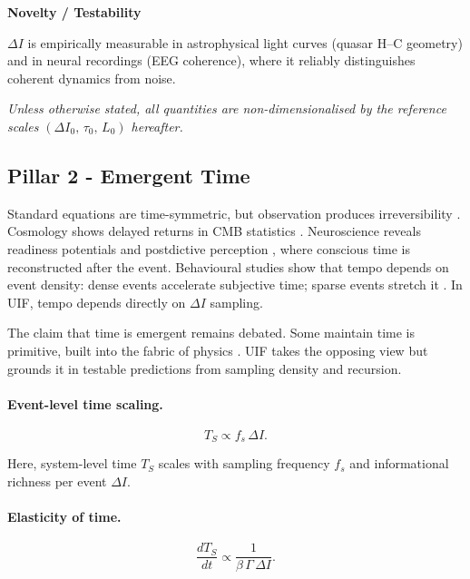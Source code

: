\noindent \textbf{Novelty / Testability}

\noindent $\Delta I$ is empirically measurable in astrophysical light curves (quasar H–C geometry) and in neural recordings (EEG coherence), where it reliably distinguishes coherent dynamics from noise.

\vspace{0.6em}
\noindent\textit{Unless otherwise stated, all quantities are non-dimensionalised by the reference scales $(\Delta I_{0},\,\tau_{0},\,L_{0})$ hereafter.}
\vspace{0.6em}

\subsection {Pillar 2 - Emergent Time}

Standard equations are time-symmetric, but observation produces irreversibility \cite{PageWootters1983,Rovelli1995}. Cosmology shows delayed returns in CMB statistics \cite{Planck2018}. Neuroscience reveals readiness potentials \cite{Libet1983} and postdictive perception \cite{Eagleman2009}, where conscious time is reconstructed after the event. Behavioural studies show that tempo depends on event density: dense events accelerate subjective time; sparse events stretch it \cite{Buhusi2005}. In UIF, tempo depends directly on $\Delta I$ sampling.

The claim that time is emergent remains debated. Some maintain time is primitive, built into the fabric of physics \cite{Maudlin2007,Ismael2017}. UIF takes the opposing view but grounds it in testable predictions from sampling density and recursion.

\paragraph{Event-level time scaling.}
\begin{equation}
\label{eq:63}
T_S \propto f_s\, \Delta I.
\end{equation}

Here, system-level time $T_S$ scales with sampling frequency $f_s$ and informational richness per event $\Delta I$.

\paragraph{Elasticity of time.}
\begin{equation}
\label{eq:64}
\frac{d T_S}{dt} \propto \frac{1}{\beta\, \Gamma \, \Delta I}.
\end{equation}

